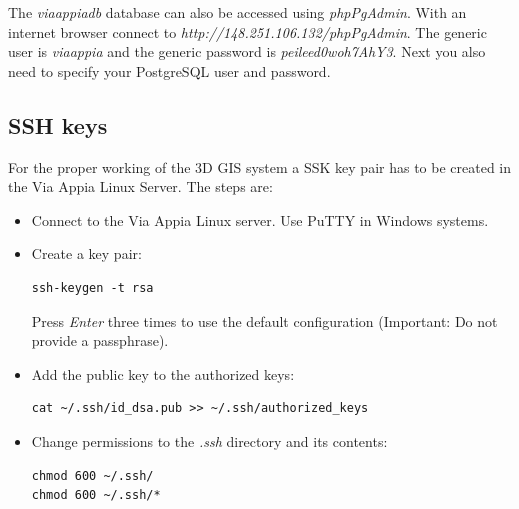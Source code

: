 \documentclass[a4paper,11pt]{article}
\begin{document}
The \textit{viaappiadb} database can also be accessed using \textit{phpPgAdmin}. With an internet browser connect to \textit{http://148.251.106.132/phpPgAdmin}. The generic user is \textit{viaappia} and the generic password is \textit{peileed0woh7AhY3}. Next you also need to specify your PostgreSQL user and password.

\subsection{SSH keys}
\label{sec:sshkeys}

For the proper working of the 3D GIS system a SSK key pair has to be created in the Via Appia Linux Server. The steps are:

\begin{itemize}
\item Connect to the Via Appia Linux server. Use PuTTY in Windows systems.
\item Create a key pair:
\begin{Verbatim}[fontfamily=courier,commandchars=\\\{\},fontsize=\footnotesize]
ssh-keygen -t rsa
\end{Verbatim}
 Press \textit{Enter} three times to use the default configuration (Important: Do not provide a passphrase).
\item Add the public key to the authorized keys:
\begin{Verbatim}[fontfamily=courier,commandchars=\\\{\},fontsize=\footnotesize]
cat ~/.ssh/id_dsa.pub >> ~/.ssh/authorized_keys
\end{Verbatim}
\item Change permissions to the \textit{.ssh} directory and its contents:
\begin{Verbatim}[fontfamily=courier,commandchars=\\\{\},fontsize=\footnotesize]
chmod 600 ~/.ssh/
chmod 600 ~/.ssh/*
\end{Verbatim}
\end{itemize}
\end{document}
